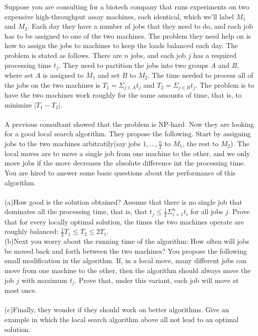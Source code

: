 \documentclass[a4paper,11pt]{article}
\begin{document}
Suppose you are consulting for a biotech company that runs experiments on two expensive high-throughput assay machines, each identical, which we'll label $M_1$ and $M_2$. Each day they have a number of jobs that they need to do, and each job has to be assigned to one of the two machines. The problem they need help on is how to assign the jobs to machines to keep the loads balanced each day. The problem is stated as follows. There are $n$ jobs, and each job $j$ has a required processing time $t_j$. They need to partition the jobs into two groups $A$ and $B$, where set $A$ is assigned to $M_1$ and set $B$ to $M_2$. The time needed to process all of the jobs on the two machines is $T_1=\Sigma _{j\in A}t_j$ and $T_2=\Sigma _{j\in B}t_j$. The problem is to have the two machines work roughly for the same amounts of time, that is, to minimize $|T_1-T_2|$.\\\\

		A previous consultant showed that the problem is NP-hard. Now they are looking for a good local search algorithm. They propose the following. Start by assigning jobs to the two machines arbitratily(say jobs $1,...,\frac{n}{2}$ to $M_1$, the rest to $M_2$). The local moves are to move a single job from one machine to the other, and we only move jobs if the move decreases the absolute difference int the processing time. You are hired to answer some basic questions about the performance of this algorithm.\\\\

		(a)How good is the solution obtained? Assume that there is no single job that dominates all the processing time, that is, that $t_j\leq \frac{1}{2} \Sigma^n_{i=1} t_i$ for all jobs $j$. Prove that for every locally optimal solution, the times the two machines operate are roughly balanced: $\frac{1}{2}T_1\leq T_2\leq 2T_1$.\\

		(b)Next you worry about the running time of the algorithm: How often will jobs be moved back and forth between the two machines? You propose the following small modification in the algorithm. If, in a local move, many different jobs can move from one machine to the other, then the algorithm should always move the job $j$ with maximum $t_j$. Prove that, under this variant, each job will move at most once.\\\\

		(c)Finally, they wonder if they should work on better algorithms. Give an example in which the local search algorithm above all not lead to an optimal solution.
\end{document}
